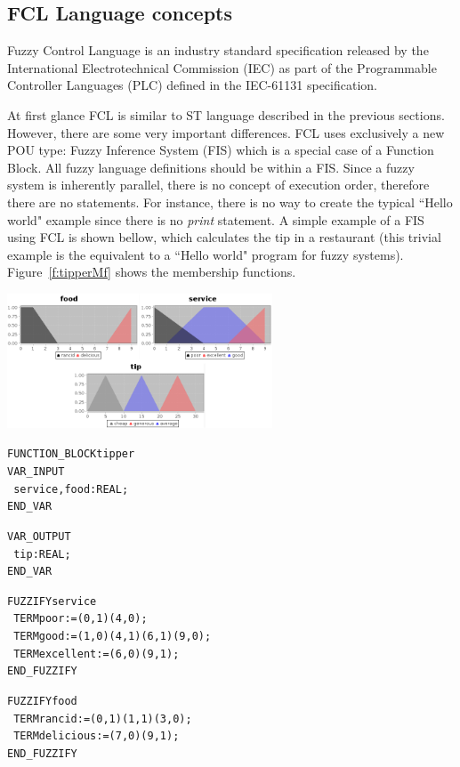 \documentclass[11pt,twoside]{article}
\begin{document}
\begin{multicols}{2}
\subsection{FCL Language concepts \label{sec:FclConcepts}}

Fuzzy Control Language is an industry standard specification released by the International Electrotechnical Commission (IEC) as part of the Programmable Controller Languages (PLC) defined in the IEC-61131 specification.

At first glance FCL is similar to ST language described in the previous sections. 
However, there are some very important differences. 
FCL uses exclusively a new POU type: Fuzzy Inference System (FIS) which is a special case of a Function Block. 
All fuzzy language definitions should be within a FIS. 
Since a fuzzy system is inherently parallel, there is no concept of execution order, therefore there are no statements. 
For instance, there is no way to create the typical ``Hello world" example since there is no \textit{print} statement. 
A simple example of a FIS using FCL is shown bellow, which calculates the tip in a restaurant (this trivial example is the equivalent to a ``Hello world" program for fuzzy systems). Figure~\ref{f:tipperMf} shows the membership functions.

\vspace*{10pt}
\centerline{\includegraphics[width=3.1in]{./figs/tipper_MF.png}}
\vspace*{10pt}
\label{f:tipperMf}
\vspace*{10pt}

\begin{tiny}
\begin{alltt}
FUNCTION\_BLOCK tipper
VAR\_INPUT
\ 	service, food : REAL;
END\_VAR

VAR\_OUTPUT
\ 	tip : REAL;
END\_VAR

FUZZIFY service
\ 	TERM poor := (0, 1) (4, 0) ;
\ 	TERM good := (1, 0) (4,1) (6,1) (9,0);
\ 	TERM excellent := (6, 0) (9, 1);
END\_FUZZIFY

FUZZIFY food
\ 	TERM rancid := (0, 1) (1, 1) (3,0);
\ 	TERM delicious := (7,0) (9,1);
END\_FUZZIFY


\end{alltt}
\end{tiny}
\end{multicols}
\end{document}

